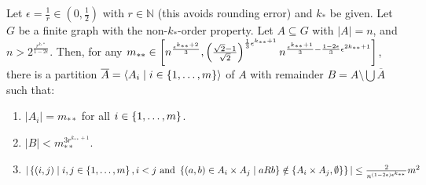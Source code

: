     \theorem[Theorem 4.16]
        Let $\epsilon = \frac{1}{r} \in \left( 0, \frac{1}{2} \right)$ with $r \in \mathbb{N}$ (this avoids rounding error)
        and $k_*$ be given.
        Let $G$ be a finite graph with the non-$k_*$-order property.
        Let $A \subseteq G$ with $|A| = n$, and $n > 2^{\frac{r^{k_**}}{1-2\epsilon}}$.
        Then, for any $m_{**} \in \left[ n^{\frac{\epsilon^{k_{**}+2}}{3}},
        \left( \frac{\sqrt{2}-1}{\sqrt{2}} \right)^{\frac{1}{3}\epsilon^{k_{**}+1}} n^{\frac{\epsilon^{k_{**}+1}}{3} -
        \frac{1-2\epsilon}{3}\epsilon^{2k_{**} + 1}} \right]$, there is a partition
        $\overline{A} = \left< A_i \mid i \in \left\{ 1, \dots, m \right\} \right>$ of $A$ with remainder
        $B = A \setminus \bigcup \overline{A}$ such that:
        \begin{enumerate}
            \item\label{itm:4.16.1} $|A_i| = m_{**}$ for all $i \in \left\{ 1, \dots, m \right\}$.
            \item\label{itm:4.16.2} $|B| < m_{**}^{3r^{k_{**}+1}}$.
            \item\label{itm:4.16.3} $|\left\{ (i,j) \mid i,j \in \left\{ 1, \dots, m \right\}, i < j \text{ and }
                \left\{ (a,b) \in A_i \times A_j \mid a R b \right\} \notin
                \left\{ A_i \times A_j, \emptyset \right\} \right\}|
                \leq \frac{2}{n^{(1-2\epsilon)\epsilon^{k_{**}}}} m^2$
        \end{enumerate}
